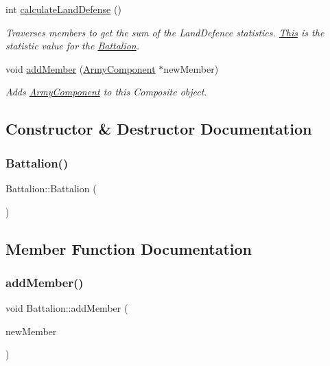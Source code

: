 \begin{DoxyCompactItemize}
int \mbox{\hyperlink{class_battalion_a1285a61a5fa793a18bc8122a036d3ac3}{calculate\+Land\+Defense}} ()
\begin{DoxyCompactList}\small\item\em Traverses members to get the sum of the Land\+Defence statistics. \mbox{\hyperlink{class_this}{This}} is the statistic value for the \mbox{\hyperlink{class_battalion}{Battalion}}. \end{DoxyCompactList}\item 
void \mbox{\hyperlink{class_battalion_a5ddf1bec9075e00dc11e1020af3d5b67}{add\+Member}} (\mbox{\hyperlink{class_army_component}{Army\+Component}} $\ast$new\+Member)
\begin{DoxyCompactList}\small\item\em Adds \mbox{\hyperlink{class_army_component}{Army\+Component}} to this Composite object. \end{DoxyCompactList}\end{DoxyCompactItemize}


\subsection{Constructor \& Destructor Documentation}
\mbox{\label{class_battalion_a0df462bc8953b18b85f418715f6afa90}} 
\subsubsection{\texorpdfstring{Battalion()}{Battalion()}}
{\footnotesize\ttfamily Battalion\+::\+Battalion (\begin{DoxyParamCaption}{ }\end{DoxyParamCaption})}



\subsection{Member Function Documentation}
\mbox{\label{class_battalion_a5ddf1bec9075e00dc11e1020af3d5b67}} 
\subsubsection{\texorpdfstring{addMember()}{addMember()}}
{\footnotesize\ttfamily void Battalion\+::add\+Member (\begin{DoxyParamCaption}\item[{\mbox{\hyperlink{class_army_component}{Army\+Component}} $\ast$}]{new\+Member }\end{DoxyParamCaption})\hspace{0.3cm}{\ttfamily [virtual]}}



